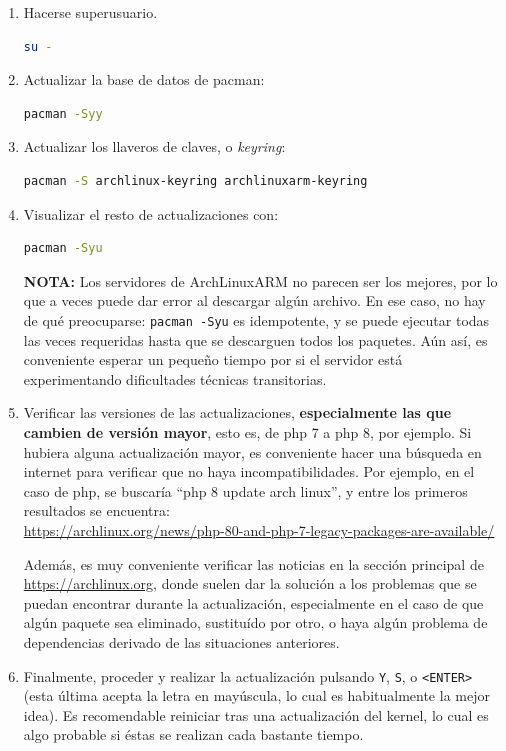 \begin{enumerate}
    \item Hacerse superusuario.
\begin{lstlisting}[language=bash]
su -
\end{lstlisting}
    \item Actualizar la base de datos de pacman:
\begin{lstlisting}[language=bash]
pacman -Syy
\end{lstlisting}
    \item Actualizar los llaveros de claves, o \textit{keyring}:
\begin{lstlisting}[language=bash]
pacman -S archlinux-keyring archlinuxarm-keyring
\end{lstlisting}
    \item Visualizar el resto de actualizaciones con:
\begin{lstlisting}[language=bash]
pacman -Syu
\end{lstlisting}
    \textbf{NOTA:} Los servidores de ArchLinuxARM no parecen ser los mejores, por lo que a veces puede dar error al descargar algún archivo. En ese caso, no hay de qué preocuparse: \texttt{pacman -Syu} es idempotente, y se puede ejecutar todas las veces requeridas hasta que se descarguen todos los paquetes. Aún así, es conveniente esperar un pequeño tiempo por si el servidor está experimentando dificultades técnicas transitorias.
    
    \item Verificar las versiones de las actualizaciones, \textbf{especialmente las que cambien de versión mayor}, esto es, de php 7 a php 8, por ejemplo. Si hubiera alguna actualización mayor, es conveniente hacer una búsqueda en internet para verificar que no haya incompatibilidades.
    Por ejemplo, en el caso de php, se buscaría ``php 8 update arch linux'', y entre los primeros resultados se encuentra: \\\footnotesize\url{https://archlinux.org/news/php-80-and-php-7-legacy-packages-are-available/}\normalsize

    Además, es muy conveniente verificar las noticias en la sección principal de \url{https://archlinux.org}, donde suelen dar la solución a los problemas que se puedan encontrar durante la actualización, especialmente en el caso de que algún paquete sea eliminado, sustituído por otro, o haya algún problema de dependencias derivado de las situaciones anteriores.

    \item Finalmente, proceder y realizar la actualización pulsando \texttt{Y}, \texttt{S}, o \texttt{<ENTER>} (esta última acepta la letra en mayúscula, lo cual es habitualmente la mejor idea). Es recomendable reiniciar tras una actualización del kernel, lo cual es algo probable si éstas se realizan cada bastante tiempo.
\end{enumerate}


